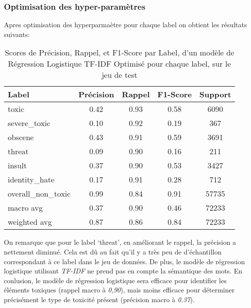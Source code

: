 \subsubsection{Optimisation des hyper-paramètres}
Apres optimisation des hyperparmaètre pour chaque label on obtient les résultats suivants:

\begin{table}[ht]
    \centering
    \caption{Scores de Précision, Rappel, et F1-Score par Label, d'un modèle de Régression Logistique TF-IDF Optimisé pour chaque label, sur le jeu de test}    \begin{tabular}{lcccc}
    \hline
    \textbf{Label} & \textbf{Précision} & \textbf{Rappel} & \textbf{F1-Score} & \textbf{Support} \\ \hline
    toxic          & 0.42               & 0.93            & 0.58              & 6090             \\
    severe\_toxic  & 0.10               & 0.92            & 0.19              & 367              \\
    obscene        & 0.43               & 0.91            & 0.59              & 3691             \\
    threat         & 0.09               & 0.90            & 0.16              & 211              \\
    insult         & 0.37               & 0.90            & 0.53              & 3427             \\
    identity\_hate & 0.17               & 0.91            & 0.28              & 712              \\
    overall\_non\_toxic & 0.99           & 0.84            & 0.91              & 57735            \\\hline
    macro avg      & 0.37               & 0.90            & 0.46              & 72233            \\
    weighted avg   & 0.87               & 0.86            & 0.84              & 72233            \\ \hline
    \end{tabular}
    \label{tab:scores}
\end{table}

On remarque que pour le label `threat', en améliorant le rappel, la précision a nettement diminué. 
Cela est dû au fait qu'il y a très peu de d'échantillon correspondant à ce label dans le jeu de données. 
De plus, le modèle de régression logistique utilisant \textit{TF-IDF} ne prend pas en compte la sémantique des mots. 
En conlusion, le modèle de régression logistique sera efficace pour identifier les éléments toxiques (rappel macro à \textit{0,90}), mais moins efficace pour déterminer précisément le type de toxicité présent (précision macro à \textit{0.37}).

